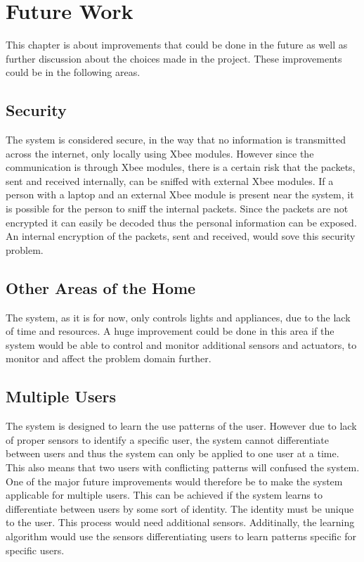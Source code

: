 \chapter{Future Work}
\label{chap:future_work}
This chapter is about improvements that could be done in the future as well as further discussion about the choices made in the project. These improvements could be in the following areas.

\section{Security}
The system is considered secure, in the way that no information is transmitted across the internet, only locally using Xbee modules. However since the communication is through Xbee modules, there is a certain risk that the packets, sent and received internally, can be sniffed with external Xbee modules. If a person with a laptop and an external Xbee module is present near the system, it is possible for the person to sniff the internal packets. Since the packets are not encrypted it can easily be decoded thus the personal information can be exposed. An internal encryption of the packets, sent and received, would sove this security problem.

\section{Other Areas of the Home}
The system, as it is for now, only controls lights and appliances, due to the lack of time and resources. A huge improvement could be done in this area if the system would be able to control and monitor additional sensors and actuators, to monitor and affect the problem domain further.

\section{Multiple Users}
The system is designed to learn the use patterns of the user. However due to lack of proper sensors to identify a specific user, the system cannot differentiate between users and thus the system can only be applied to one user at a time. This also means that two users with conflicting patterns will confused the system. One of the major future improvements would therefore be to make the system applicable for multiple users. This can be achieved if the system learns to differentiate between users by some sort of identity. The identity must be unique to the user. This process would need additional sensors. Additinally, the learning algorithm would use the sensors differentiating users to learn patterns specific for specific users.

